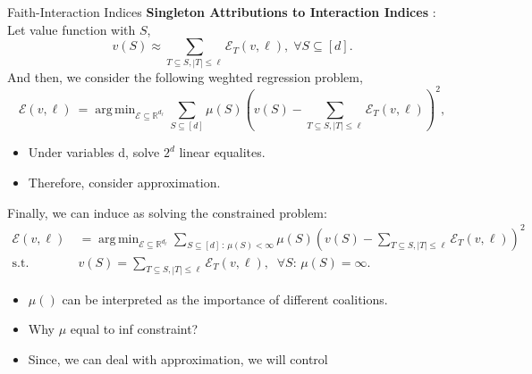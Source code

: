 \documentclass[10pt]{beamer}
\newcommand{\f}{v}
\newcommand{\ex}{\Expl}
\def\Expl{\mathcal{E}}
\DeclareMathOperator*{\argmin}{arg\,min}
\begin{document}
\begin{frame}{Faith-Interaction Indices}
    \textbf{Singleton Attributions to Interaction Indices} : \\
    Let value function with $S$, \[\f(S) \approx \sum_{T \subseteq S, |T| \leq \ell} \Expl_T(\f,\ell),\; \forall S \subseteq [d].\]
    And then, we consider the following weghted regression problem,
    \begin{equation*}
    \label{eqn:weighted_regression}
    \ex(\f, \ell) \ = \argmin_{\Expl \subseteq \mathbb{R}^{d_\ell} } 
    \sum_{S \subseteq [d]}  \mu(S) \left( \f(S) - \sum_{T \subseteq S , |T| \leq \ell}\Expl_T(\f,\ell) \right)^2,
    \tag{9}
    \end{equation*}
    \vspace{1.5em}
    \begin{itemize}[label=\scalebox{0.5}{$\blacksquare$}]
        \item Under variables d, solve $2^d$ linear equalites.
        \item Therefore, consider approximation. 
    \end{itemize}
\end{frame}
\begin{frame}
    Finally, we can induce as solving the constrained problem:
    \begin{align*}
    \ex(\f, \ell) \ 
    &= \argmin_{\Expl \subseteq \mathbb{R}^{d_\ell} } \sum_{S \subseteq [d]\,:\, \mu(S) < \infty}  \mu(S) \left( \f(S) - \sum_{T \subseteq S , |T| \leq \ell}\Expl_T(\f,\ell) \right)^2 \nonumber \\
    \text{s.t.} \ & \f(S) = \sum_{T \subseteq S , |T| \leq \ell}\Expl_T(\f,\ell), \;\;\forall S :\, \mu(S) = \infty.
    \label{eqn:constrained_weighted_regresion}
    \tag{10}
    \end{align*}
    \vspace{2em}
    \begin{itemize}[label=\scalebox{0.5}{$\blacksquare$}]
        \item $\mu()$ can be interpreted as the importance of different coalitions.
        \item Why $\mu$ equal to inf constraint?
        \item Since, we can deal with approximation, we will control 
    \end{itemize}
\end{frame}
\end{document}
